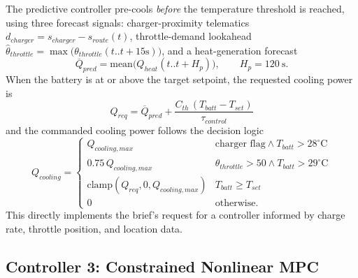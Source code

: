 \documentclass[10pt,conference]{IEEEtran}
\begin{document}
The predictive controller pre-cools \emph{before} the temperature threshold is reached, using three forecast signals: charger-proximity telematics $d_{charger}=s_{charger}-s_{route}(t)$, throttle-demand lookahead $\hat{\theta}_{throttle}=\max\big(\theta_{throttle}(t..t{+}15\text{s})\big)$, and a heat-generation forecast
\begin{equation}
\overline{Q}_{pred} = \text{mean}\big(Q_{heat}(t..t{+}H_p)\big), \qquad H_p = 120\ \text{s}.
\end{equation}
When the battery is at or above the target setpoint, the requested cooling power is
\begin{equation}
Q_{req} = \overline{Q}_{pred} + \frac{C_{th}\,(T_{batt}-T_{set})}{\tau_{control}}
\end{equation}
and the commanded cooling power follows the decision logic
\begin{equation}
Q_{cooling} = \begin{cases}
Q_{cooling,max} & \text{charger flag}\wedge T_{batt}{>}28^{\circ}\text{C} \\
0.75\,Q_{cooling,max} & \hat{\theta}_{throttle}{>}50\wedge T_{batt}{>}29^{\circ}\text{C} \\
\text{clamp}(Q_{req},0,Q_{cooling,max}) & T_{batt}\ge T_{set} \\
0 & \text{otherwise.}
\end{cases}
\end{equation}
This directly implements the brief's request for a controller informed by charge rate, throttle position, and location data.

\subsection{Controller 3: Constrained Nonlinear MPC}
\end{document}
